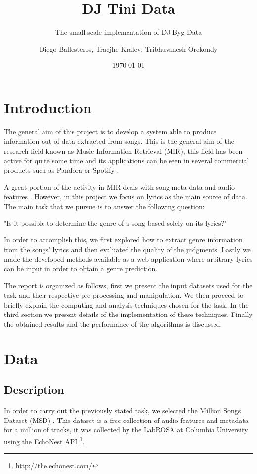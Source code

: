 \documentclass[10pt,a4paper]{scrartcl}
\author{Diego Ballesteros, Tracjhe Kralev, Tribhuvanesh Orekondy}
\title{DJ Tini Data}
\subtitle{The small scale implementation of DJ Byg Data}
\date{\today}
\begin{document}
  \maketitle
  \section{Introduction}
    The general aim of this project is to develop a system able to produce
    information out of data extracted from songs. This is the general
    aim of the research field known as Music Information Retrieval (MIR),
    this field has been active for quite some time \cite{nameThatTune:1993}
    and its applications can be seen in several commercial products such as
    Pandora or Spotify \cite{recommendation:2010}.

    A great portion of the activity in MIR deals with song meta-data and audio
    features \cite{McFee:2012:MSD:2187980.2188222}. However, in this project we
    focus on lyrics as the main source of data.
    The main task that we pursue is to answer the following question:
    
    "Is it possible to determine the genre of a song based solely on its
    lyrics?"
     
    In order to accomplish this, we first explored how to extract genre
    information from the songs' lyrics and then evaluated the quality of the
    judgments. Lastly we made the developed methods available as a web
    application where arbitrary lyrics can be input in order to obtain
    a genre prediction.
    
    The report is organized as follows, first we present the input datasets used
    for the task and their respective pre-processing and manipulation. We then
    proceed to briefly explain the computing and analysis techniques chosen for
    the task. In the third section we present details of the implementation of
    these techniques. Finally the obtained results and the performance of the
    algorithms is discussed.
  \section{Data}
  
    \subsection{Description} \label{sec:data:subsec:description}
    In order to carry out the previously stated task, we selected the Million
    Songs Dataset (MSD) \cite{Bertin-Mahieux2011}.
    This dataset is a free collection of audio features and metadata for a million
    of tracks, it was collected by the LabROSA at Columbia University using
    the EchoNest API
    \footnote{\url{http://the.echonest.com/}}.
    
\end{document}
